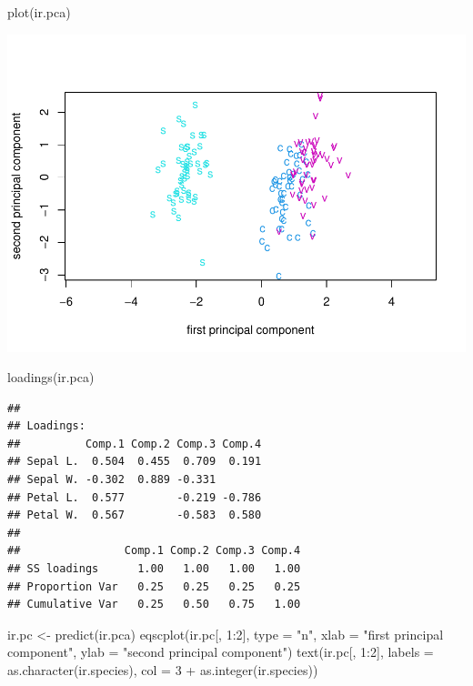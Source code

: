\documentclass[
]{article}
\newenvironment{Shaded}{\begin{snugshade}}{\end{snugshade}}
\newcommand{\AttributeTok}[1]{\textcolor[rgb]{0.77,0.63,0.00}{#1}}
\newcommand{\DecValTok}[1]{\textcolor[rgb]{0.00,0.00,0.81}{#1}}
\newcommand{\FunctionTok}[1]{\textcolor[rgb]{0.00,0.00,0.00}{#1}}
\newcommand{\NormalTok}[1]{#1}
\newcommand{\OtherTok}[1]{\textcolor[rgb]{0.56,0.35,0.01}{#1}}
\newcommand{\SpecialCharTok}[1]{\textcolor[rgb]{0.00,0.00,0.00}{#1}}
\newcommand{\StringTok}[1]{\textcolor[rgb]{0.31,0.60,0.02}{#1}}
\begin{document}
\begin{Shaded}
\begin{Highlighting}[]
\FunctionTok{plot}\NormalTok{(ir.pca)}
\end{Highlighting}
\end{Shaded}

\includegraphics{modern_applied_statistics_CH11_files/figure-latex/unnamed-chunk-4-1.pdf}

\begin{Shaded}
\begin{Highlighting}[]
\FunctionTok{loadings}\NormalTok{(ir.pca)}
\end{Highlighting}
\end{Shaded}

\begin{verbatim}
## 
## Loadings:
##          Comp.1 Comp.2 Comp.3 Comp.4
## Sepal L.  0.504  0.455  0.709  0.191
## Sepal W. -0.302  0.889 -0.331       
## Petal L.  0.577        -0.219 -0.786
## Petal W.  0.567        -0.583  0.580
## 
##                Comp.1 Comp.2 Comp.3 Comp.4
## SS loadings      1.00   1.00   1.00   1.00
## Proportion Var   0.25   0.25   0.25   0.25
## Cumulative Var   0.25   0.50   0.75   1.00
\end{verbatim}

\begin{Shaded}
\begin{Highlighting}[]
\NormalTok{ir.pc }\OtherTok{\textless{}{-}} \FunctionTok{predict}\NormalTok{(ir.pca)}
\FunctionTok{eqscplot}\NormalTok{(ir.pc[, }\DecValTok{1}\SpecialCharTok{:}\DecValTok{2}\NormalTok{], }\AttributeTok{type =} \StringTok{"n"}\NormalTok{,}
         \AttributeTok{xlab =} \StringTok{"first principal component"}\NormalTok{,}
         \AttributeTok{ylab =} \StringTok{"second principal component"}\NormalTok{)}
\FunctionTok{text}\NormalTok{(ir.pc[, }\DecValTok{1}\SpecialCharTok{:}\DecValTok{2}\NormalTok{], }\AttributeTok{labels =} \FunctionTok{as.character}\NormalTok{(ir.species),}
     \AttributeTok{col =} \DecValTok{3} \SpecialCharTok{+} \FunctionTok{as.integer}\NormalTok{(ir.species)) }
\end{Highlighting}
\end{Shaded}
\end{document}
